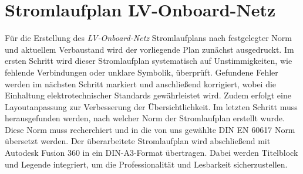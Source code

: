 
\addtocounter{page}{1} %

\section*{Stromlaufplan LV-Onboard-Netz}
Für die Erstellung des \textit{LV-Onboard-Netz} Stromlaufplans nach festgelegter Norm und aktuellem Verbaustand wird der vorliegende Plan zunächst ausgedruckt. Im ersten Schritt wird dieser Stromlaufplan systematisch auf Unstimmigkeiten, wie fehlende Verbindungen oder unklare Symbolik, überprüft. Gefundene Fehler werden im nächsten Schritt markiert und anschließend korrigiert, wobei die Einhaltung elektrotechnischer Standards gewährleistet wird. Zudem erfolgt eine Layoutanpassung zur Verbesserung der Übersichtlichkeit. Im letzten Schritt muss herausgefunden werden, nach welcher Norm der Stromlaufplan erstellt wurde. Diese Norm muss recherchiert und in die von uns gewählte DIN EN 60617 Norm \glqq übersetzt\grqq {} werden. Der überarbeitete Stromlaufplan wird abschließend mit Autodesk Fusion 360 in ein DIN-A3-Format übertragen. Dabei werden Titelblock und Legende integriert, um die Professionalität und Lesbarkeit sicherzustellen.


\addtocounter{page}{1} %

